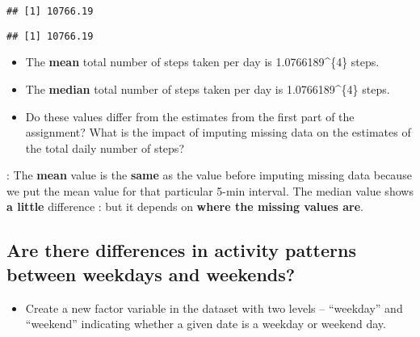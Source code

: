 \documentclass[]{article}
\newenvironment{Shaded}{\begin{snugshade}}{\end{snugshade}}
\newcommand{\KeywordTok}[1]{\textcolor[rgb]{0.13,0.29,0.53}{\textbf{#1}}}
\newcommand{\DataTypeTok}[1]{\textcolor[rgb]{0.13,0.29,0.53}{#1}}
\newcommand{\DecValTok}[1]{\textcolor[rgb]{0.00,0.00,0.81}{#1}}
\newcommand{\StringTok}[1]{\textcolor[rgb]{0.31,0.60,0.02}{#1}}
\newcommand{\CommentTok}[1]{\textcolor[rgb]{0.56,0.35,0.01}{\textit{#1}}}
\newcommand{\OperatorTok}[1]{\textcolor[rgb]{0.81,0.36,0.00}{\textbf{#1}}}
\newcommand{\NormalTok}[1]{#1}
\providecommand{\tightlist}{%
  \setlength{\itemsep}{0pt}\setlength{\parskip}{0pt}}
\begin{document}
\begin{verbatim}
## [1] 10766.19
\end{verbatim}

\begin{Shaded}
\end{Shaded}

\begin{verbatim}
## [1] 10766.19
\end{verbatim}

\begin{itemize}
\item
  The \textbf{mean} total number of steps taken per day is
  1.0766189\^{}\{4\} steps.
\item
  The \textbf{median} total number of steps taken per day is
  1.0766189\^{}\{4\} steps.
\item
  Do these values differ from the estimates from the first part of the
  assignment? What is the impact of imputing missing data on the
  estimates of the total daily number of steps?
\end{itemize}

: The \textbf{mean} value is the \textbf{same} as the value before
imputing missing data because we put the mean value for that particular
5-min interval. The median value shows \textbf{a little} difference :
but it depends on \textbf{where the missing values are}.

\subsection{Are there differences in activity patterns between weekdays
and
weekends?}\label{are-there-differences-in-activity-patterns-between-weekdays-and-weekends}

\begin{itemize}
\tightlist
\item
  Create a new factor variable in the dataset with two levels --
  ``weekday'' and ``weekend'' indicating whether a given date is a
  weekday or weekend day.
\end{itemize}

\begin{Shaded}
\end{Shaded}
\end{document}

